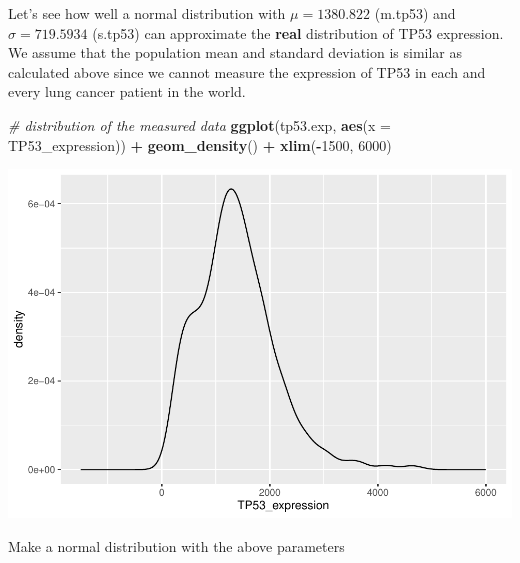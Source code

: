 \documentclass[
]{book}
\newenvironment{Shaded}{\begin{snugshade}}{\end{snugshade}}
\newcommand{\AttributeTok}[1]{\textcolor[rgb]{0.13,0.29,0.53}{#1}}
\newcommand{\CommentTok}[1]{\textcolor[rgb]{0.56,0.35,0.01}{\textit{#1}}}
\newcommand{\DecValTok}[1]{\textcolor[rgb]{0.00,0.00,0.81}{#1}}
\newcommand{\FunctionTok}[1]{\textcolor[rgb]{0.13,0.29,0.53}{\textbf{#1}}}
\newcommand{\NormalTok}[1]{#1}
\newcommand{\SpecialCharTok}[1]{\textcolor[rgb]{0.81,0.36,0.00}{\textbf{#1}}}
\begin{document}
Let's see how well a normal distribution with \(\mu = 1380.822\) (m.tp53) and \(\sigma = 719.5934\) (s.tp53) can approximate the \textbf{real} distribution of TP53 expression.\\
We assume that the population mean and standard deviation is similar as calculated above since we cannot measure the expression of TP53 in each and every lung cancer patient in the world.

\begin{Shaded}
\begin{Highlighting}[]
\CommentTok{\# distribution of the measured data}
\FunctionTok{ggplot}\NormalTok{(tp53.exp,}
       \FunctionTok{aes}\NormalTok{(}\AttributeTok{x =}\NormalTok{ TP53\_expression)) }\SpecialCharTok{+}
  \FunctionTok{geom\_density}\NormalTok{() }\SpecialCharTok{+} 
  \FunctionTok{xlim}\NormalTok{(}\SpecialCharTok{{-}}\DecValTok{1500}\NormalTok{, }\DecValTok{6000}\NormalTok{)}
\end{Highlighting}
\end{Shaded}

\includegraphics{_main_files/figure-latex/unnamed-chunk-97-1.pdf}

Make a normal distribution with the above parameters
\end{document}
